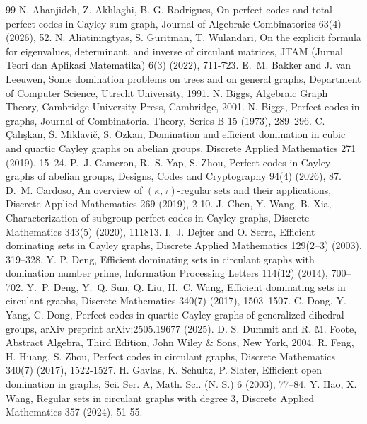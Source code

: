 \documentclass[12pt]{article}
\begin{document}
\begin{thebibliography}{99}	 N. Ahanjideh, Z. Akhlaghi, B. G. Rodrigues, On perfect codes and total perfect codes in Cayley sum graph, Journal of Algebraic Combinatorics 63(4) (2026), 52.	 N. Aliatiningtyas, S. Guritman, T. Wulandari,	On the explicit formula for eigenvalues, determinant, and inverse of circulant matrices,	JTAM (Jurnal Teori dan Aplikasi Matematika) 6(3) (2022), 711-723.	 E.~M. Bakker and J. van Leeuwen, Some domination problems on trees and on general graphs, Department of Computer Science, Utrecht University, 1991.	  N. Biggs, Algebraic Graph Theory, Cambridge University Press, Cambridge, 2001.
 N. Biggs, Perfect codes in graphs, Journal of Combinatorial Theory, Series B 15 (1973), 289--296.	 C. Çalışkan, Š. Miklavič, S. Özkan, Domination and efficient domination in cubic and quartic Cayley graphs on abelian groups, Discrete Applied Mathematics 271 (2019), 15--24.	 P.~J. Cameron, R.~S. Yap, S. Zhou, Perfect codes in Cayley graphs of abelian groups, Designs, Codes and Cryptography 94(4) (2026), 87.	 D.~M. Cardoso, An overview of $(\kappa,\tau)$-regular sets and their applications, Discrete Applied Mathematics 269 (2019), 2-10.
 J. Chen, Y. Wang, B. Xia, Characterization of subgroup perfect codes in Cayley graphs, Discrete Mathematics 343(5) (2020), 111813.
 I.~J. Dejter and O. Serra, Efficient dominating sets in Cayley graphs, Discrete Applied Mathematics 129(2--3) (2003), 319--328.
 Y. P. Deng, Efficient dominating sets in circulant graphs with domination number prime, Information Processing Letters 114(12) (2014), 700--702.
 Y.~P. Deng, Y.~Q. Sun, Q. Liu, H.~C. Wang, Efficient dominating sets in circulant graphs, Discrete Mathematics 340(7) (2017), 1503--1507.
 C. Dong, Y. Yang, C. Dong, Perfect codes in quartic Cayley graphs of generalized dihedral groups, arXiv preprint arXiv:2505.19677 (2025).
 D. S. Dummit and R. M. Foote, Abstract Algebra, Third Edition, John Wiley \& Sons, New York, 2004.
 R. Feng, H. Huang, S. Zhou, Perfect codes in circulant graphs, Discrete Mathematics 340(7) (2017), 1522-1527.
 H. Gavlas, K. Schultz, P. Slater, Efficient open domination in graphs, Sci. Ser. A, Math. Sci. (N. S.) 6 (2003), 77--84.	 Y. Hao, X. Wang, Regular sets in circulant graphs with degree $3$, Discrete Applied Mathematics 357 (2024), 51-55.

\end{thebibliography}
\end{document}
